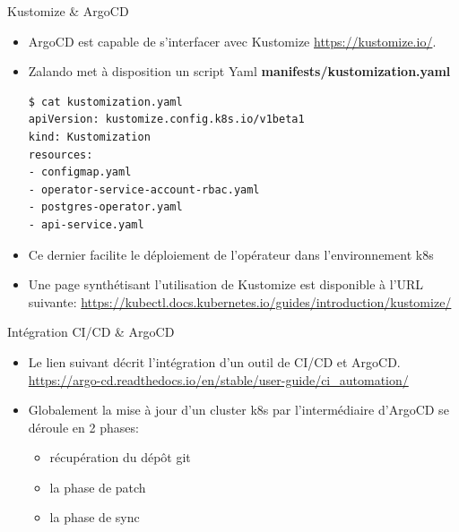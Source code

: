 
\begin{frame}[fragile]{Kustomize \& ArgoCD}

\begin{itemize}
   \item ArgoCD est capable de s'interfacer avec Kustomize \url{https://kustomize.io/}.
   \item Zalando met à disposition un script Yaml \textbf{manifests/kustomization.yaml}
\begin{tiny}
\begin{Verbatim}[commandchars=\&\@\@]
$ cat kustomization.yaml 
apiVersion: kustomize.config.k8s.io/v1beta1
kind: Kustomization
resources:
- configmap.yaml
- operator-service-account-rbac.yaml
- postgres-operator.yaml
- api-service.yaml
\end{Verbatim}
\end{tiny}
   \item Ce dernier facilite le déploiement de l'opérateur dans l'environnement k8s
   \item Une page synthétisant l'utilisation de Kustomize est disponible à l'URL suivante: \url{https://kubectl.docs.kubernetes.io/guides/introduction/kustomize/}
\end{itemize}

\end{frame}


\begin{frame}[fragile]{Intégration CI/CD \& ArgoCD}

\begin{itemize}
   \item Le lien suivant décrit l'intégration d'un outil de CI/CD et ArgoCD. \url{https://argo-cd.readthedocs.io/en/stable/user-guide/ci_automation/}
   \item Globalement la mise à jour d'un cluster k8s par l'intermédiaire d'ArgoCD se déroule en 2 phases:
   \begin{itemize}
      \item récupération du dépôt git
      \item la phase de patch
      \item la phase de sync
   \end{itemize}
\end{itemize}

\end{frame}

